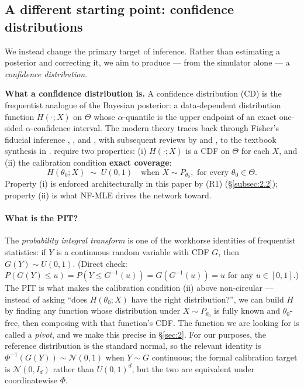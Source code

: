 \documentclass[11pt]{article}
\begin{document}
\subsection{A different starting point: confidence distributions}\label{subsec:1.2}

We instead change the primary target of inference. Rather than
estimating a posterior and correcting it, we aim to produce --- from the
simulator alone --- a \emph{confidence distribution}.

\textbf{What a confidence distribution is.} A confidence distribution
(CD) is the frequentist analogue of the Bayesian posterior: a
data-dependent distribution function \(H(\cdot; X)\) on \(\Theta\) whose
\(\alpha\)-quantile is the upper endpoint of an exact one-sided
\(\alpha\)-confidence interval. The modern theory traces back through
Fisher's fiducial inference \citep{Fisher1930}, \citet{Cox1958}, and
\citet{Efron1993, Efron1998}, with subsequent reviews by
\citet{SinghEtAl2007} and \citet{XieSingh2013}, to the textbook
synthesis in \citet{SchwederHjort2016}. \citet[Def.~3.1]{SchwederHjort2016} require
two properties: (i) \(H(\cdot; X)\) is a CDF on \(\Theta\) for each
\(X\), and (ii) the calibration condition
\textbf{exact coverage}: \[
H(\theta_0; X) \;\sim\; U(0,1) \quad \text{when } X \sim P_{\theta_0}, \text{ for every } \theta_0 \in \Theta.
\] Property (i) is enforced architecturally in this paper by (R1)
(\S\ref{subsec:2.2}); property (ii) is what NF-MLE drives the network
toward.

\paragraph{What is the PIT?} The \emph{probability integral transform}
is one of the workhorse identities of frequentist statistics: if \(Y\)
is a continuous random variable with CDF \(G\), then \(G(Y) \sim U(0,1)\).
(Direct check: \(P(G(Y) \le u) = P(Y \le G^{-1}(u)) = G(G^{-1}(u)) = u\)
for any \(u \in [0, 1]\).) The PIT is what makes the calibration
condition (ii) above non-circular --- instead of asking ``does
\(H(\theta_0; X)\) have the right distribution?'', we can build \(H\) by
finding any function whose distribution under \(X \sim P_{\theta_0}\) is
fully known and \(\theta_0\)-free, then composing with that function's
CDF. The function we are looking for is called a \emph{pivot}, and we
make this precise in \S\ref{sec:2}. For our purposes, the reference
distribution is the standard normal, so the relevant identity is
\(\Phi^{-1}(G(Y)) \sim \mathcal{N}(0, 1)\) when \(Y \sim G\) continuous;
the formal calibration target is \(\mathcal{N}(0, I_d)\) rather than
\(U(0,1)^d\), but the two are equivalent under coordinatewise \(\Phi\).
\end{document}
